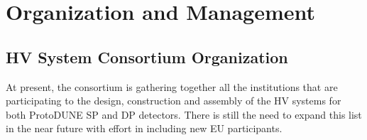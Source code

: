 \section{Organization and Management}
\label{sec:fdsp-hv-org}


\subsection{HV System Consortium Organization}
\label{sec:fdsp-hv-org-consortium}

At present, the consortium is gathering together all the institutions that are participating to the design, construction and assembly of the HV systems for both ProtoDUNE SP and DP detectors. There is still the need to expand this list in the near future with effort in including new EU participants.


